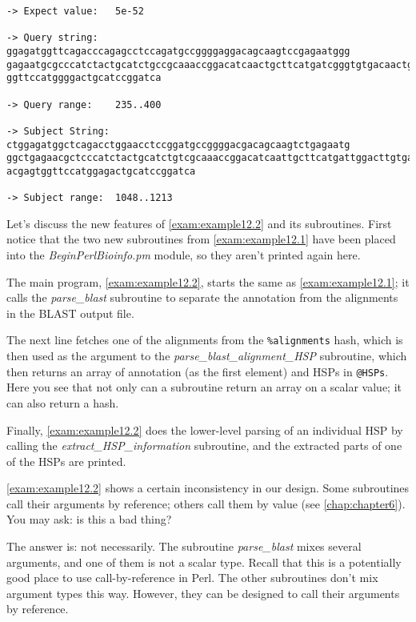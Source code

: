 \begin{lstlisting}
-> Expect value:   5e-52

-> Query string:
ggagatggttcagacccagagcctccagatgccggggaggacagcaagtccgagaatggg
gagaatgcgcccatctactgcatctgccgcaaaccggacatcaactgcttcatgatcgggtgtgacaactgcaatgagt
ggttccatggggactgcatccggatca

-> Query range:    235..400

-> Subject String:
ctggagatggctcagacctggaacctccggatgccggggacgacagcaagtctgagaatg
ggctgagaacgctcccatctactgcatctgtcgcaaaccggacatcaattgcttcatgattggacttgtgacaactgca
acgagtggttccatggagactgcatccggatca

-> Subject range:  1048..1213
\end{lstlisting}

Let's discuss the new features of \autoref{exam:example12.2} and its subroutines.  First notice that the two new subroutines from \autoref{exam:example12.1} have been placed into the \textit{BeginPerlBioinfo.pm} module, so they aren't printed again here.

The main program, \autoref{exam:example12.2}, starts the same as \autoref{exam:example12.1}; it calls the \textit{parse\_blast} subroutine to separate the annotation from the alignments in the BLAST output file.

The next line fetches one of the alignments from the \verb|%alignments| hash, which is then used as the argument to the \textit{parse\_blast\_alignment\_HSP} subroutine, which then returns an array of annotation (as the first element) and HSPs in \verb|@HSPs|. Here you see that not only can a subroutine return an array on a scalar value; it can also return a hash.

Finally, \autoref{exam:example12.2} does the lower-level parsing of an individual HSP by calling the \textit{extract\_HSP\_information} subroutine, and the extracted parts of one of the HSPs are printed.

\autoref{exam:example12.2} shows a certain inconsistency in our design. Some subroutines call their arguments by reference; others call them by value (see \autoref{chap:chapter6}). You may ask: is this a bad thing?

The answer is: not necessarily. The subroutine \textit{parse\_blast} mixes several arguments, and one of them is not a scalar type. Recall that this is a potentially good place to use call-by-reference in Perl. The other subroutines don't mix argument types this way. However, they can be designed to call their arguments by reference.

